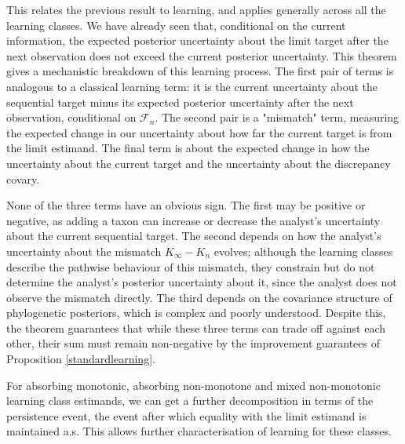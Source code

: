\documentclass{article}
\begin{document}
This relates the previous result to learning, and applies generally across all the learning classes. We have already seen that, conditional on the current information, the expected posterior uncertainty about the limit target after the next observation does not exceed the current posterior uncertainty. This theorem gives a mechanistic breakdown of this learning process. The first pair of terms is analogous to a classical learning term: it is the current uncertainty about the sequential target minus its expected posterior uncertainty after the next observation, conditional on $\mathcal{F}_n$. The second pair is a "mismatch" term, measuring the expected change in our uncertainty about how far the current target is from the limit estimand. The final term is about the expected change in how the uncertainty about the current target and the uncertainty about the discrepancy covary. 

None of the three terms have an obvious sign. The first may be positive or negative, as adding a taxon can increase or decrease the analyst's uncertainty about the current sequential target. The second depends on how the analyst's uncertainty about the mismatch $K_\infty - K_n$ evolves; although the learning classes describe the pathwise behaviour of this mismatch, they constrain but do not determine the analyst's posterior uncertainty about it, since the analyst does not observe the mismatch directly. The third depends on the covariance structure of phylogenetic posteriors, which is complex and poorly understood. Despite this, the theorem guarantees that while these three terms can trade off against each other, their sum must remain non-negative by the improvement guarantees of Proposition \ref{standardlearning}.

For absorbing monotonic, absorbing non-monotone and mixed non-monotonic learning class estimands, we can get a further decomposition in terms of the persistence event, the event after which equality with the limit estimand is maintained a.s. This allows further characterisation of learning for these classes.
\end{document}
